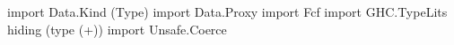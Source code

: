 \begin{code}
import Data.Kind (Type)
import Data.Proxy
import Fcf
import GHC.TypeLits hiding (type (+))
import Unsafe.Coerce
\end{code}

